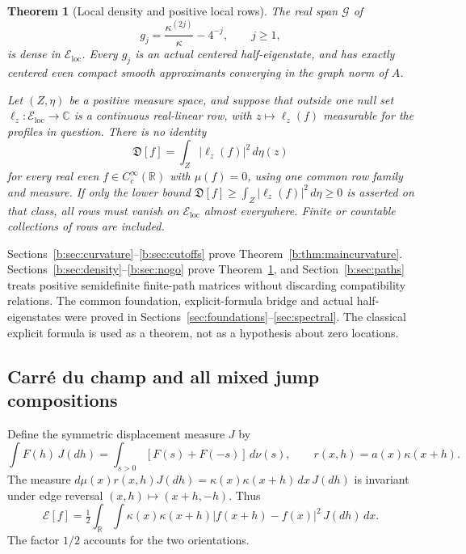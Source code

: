 \documentclass[11pt,a4paper]{article}
\numberwithin{equation}{section}
\newtheorem{theorem}{Theorem}[section]
\theoremstyle{definition}\newtheorem{definition}[theorem]{Definition}
\theoremstyle{remark}\newtheorem{remark}[theorem]{Remark}
\newcommand{\R}{\mathbb R}\newcommand{\C}{\mathbb C}\newcommand{\N}{\mathbb N}
\newcommand{\E}{\mathcal E}\newcommand{\D}{\mathcal D}
\newcommand{\Eloc}{\mathcal E_{\mathrm{loc}}}\newcommand{\Def}{\mathfrak D}
\begin{document}
\begin{theorem}[Local density and positive local rows]\label{b:thm:mainlocal}
The real span $\mathcal G$ of
\begin{equation}\label{b:eq:halfprofiles}
 g_j=\frac{\kappa^{(2j)}}\kappa-4^{-j},\qquad j\ge1,
\end{equation}
is dense in $\Eloc$. Every $g_j$ is an actual centered half-eigenstate, and has exactly centered even compact smooth approximants converging in the graph norm of $A$.

Let $(Z,\eta)$ be a positive measure space, and suppose that outside one null set $\ell_z:\Eloc\to\C$ is a continuous real-linear row, with $z\mapsto\ell_z(f)$ measurable for the profiles in question. There is no identity
\begin{equation}\label{b:eq:mainnoidentity}
 \Def[f]=\int_Z|\ell_z(f)|^2\,d\eta(z)
\end{equation}
for every real even $f\in C_c^\infty(\R)$ with $\mu(f)=0$, using one common row family and measure. If only the lower bound
$\Def[f]\ge\int_Z|\ell_z(f)|^2\,d\eta\ge0$ is asserted on that class, all rows must vanish on $\Eloc$ almost everywhere. Finite or countable collections of rows are included.
\end{theorem}

Sections~\ref{b:sec:curvature}--\ref{b:sec:cutoffs} prove Theorem~\ref{b:thm:maincurvature}. Sections~\ref{b:sec:density}--\ref{b:sec:nogo} prove Theorem~\ref{b:thm:mainlocal}, and Section~\ref{b:sec:paths} treats positive semidefinite finite-path matrices without discarding compatibility relations. The common foundation, explicit-formula bridge and actual half-eigenstates were proved in Sections~\ref{sec:foundations}--\ref{sec:spectral}. The classical explicit formula is used as a theorem, not as a hypothesis about zero locations.


\subsection{Carr\'e du champ and all mixed jump compositions}\label{b:sec:carre}

Define the symmetric displacement measure $J$ by
\[
 \int F(h)\,J(dh)=\int_{s>0}[F(s)+F(-s)]\,d\nu(s),
 \qquad r(x,h)=a(x)\kappa(x+h).
\]
The measure $d\mu(x)r(x,h)J(dh)=\kappa(x)\kappa(x+h)\,dx\,J(dh)$ is invariant under edge reversal $(x,h)\mapsto(x+h,-h)$. Thus
\begin{equation}\label{b:eq:energy-symmetric}
 \E[f]=\tfrac12\int_\R\int
       \kappa(x)\kappa(x+h)|f(x+h)-f(x)|^2\,J(dh)\,dx.
\end{equation}
The factor $1/2$ accounts for the two orientations.
\end{document}
